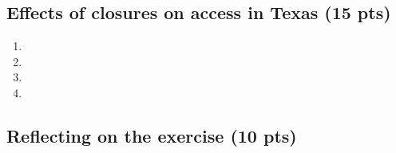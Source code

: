 \documentclass[
  letterpaper,
  DIV=11,
  numbers=noendperiod]{scrartcl}
\providecommand{\tightlist}{%
  \setlength{\itemsep}{0pt}\setlength{\parskip}{0pt}}\usepackage{longtable,booktabs,array}
\begin{document}
\subsection{Effects of closures on access in Texas (15
pts)}\label{effects-of-closures-on-access-in-texas-15-pts}

\begin{enumerate}
\def\labelenumi{\arabic{enumi}.}
\tightlist
\item
\item
\item
\item
\end{enumerate}

\subsection{Reflecting on the exercise (10
pts)}\label{reflecting-on-the-exercise-10-pts}
\end{document}
